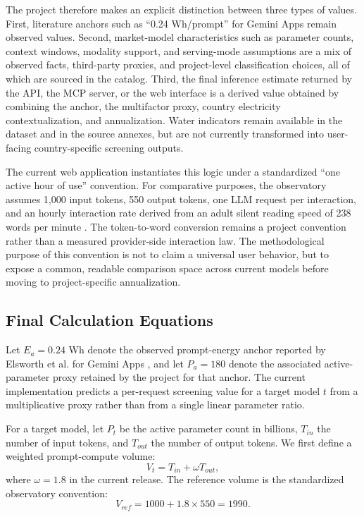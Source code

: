 \documentclass[11pt,a4paper]{article}
\begin{document}
The project therefore makes an explicit distinction between three types of values. First, literature anchors such as ``0.24 Wh/prompt'' for Gemini Apps \cite{elsworth2025} remain observed values. Second, market-model characteristics such as parameter counts, context windows, modality support, and serving-mode assumptions are a mix of observed facts, third-party proxies, and project-level classification choices, all of which are sourced in the catalog. Third, the final inference estimate returned by the API, the MCP server, or the web interface is a derived value obtained by combining the anchor, the multifactor proxy, country electricity contextualization, and annualization. Water indicators remain available in the dataset and in the source annexes, but are not currently transformed into user-facing country-specific screening outputs.

The current web application instantiates this logic under a standardized ``one active hour of use'' convention. For comparative purposes, the observatory assumes 1,000 input tokens, 550 output tokens, one LLM request per interaction, and an hourly interaction rate derived from an adult silent reading speed of 238 words per minute \cite{brysbaert2019}. The token-to-word conversion remains a project convention rather than a measured provider-side interaction law. The methodological purpose of this convention is not to claim a universal user behavior, but to expose a common, readable comparison space across current models before moving to project-specific annualization.

\subsection{Final Calculation Equations}
Let $E_a = 0.24$ Wh denote the observed prompt-energy anchor reported by Elsworth et al. for Gemini Apps \cite{elsworth2025}, and let $P_a = 180$ denote the associated active-parameter proxy retained by the project for that anchor. The current implementation predicts a per-request screening value for a target model $t$ from a multiplicative proxy rather than from a single linear parameter ratio.

For a target model, let $P_t$ be the active parameter count in billions, $T_{in}$ the number of input tokens, and $T_{out}$ the number of output tokens. We first define a weighted prompt-compute volume:
\begin{equation}
V_t = T_{in} + \omega T_{out},
\end{equation}
where $\omega = 1.8$ in the current release. The reference volume is the standardized observatory convention:
\begin{equation}
V_{ref} = 1000 + 1.8 \times 550 = 1990.
\end{equation}
\end{document}
